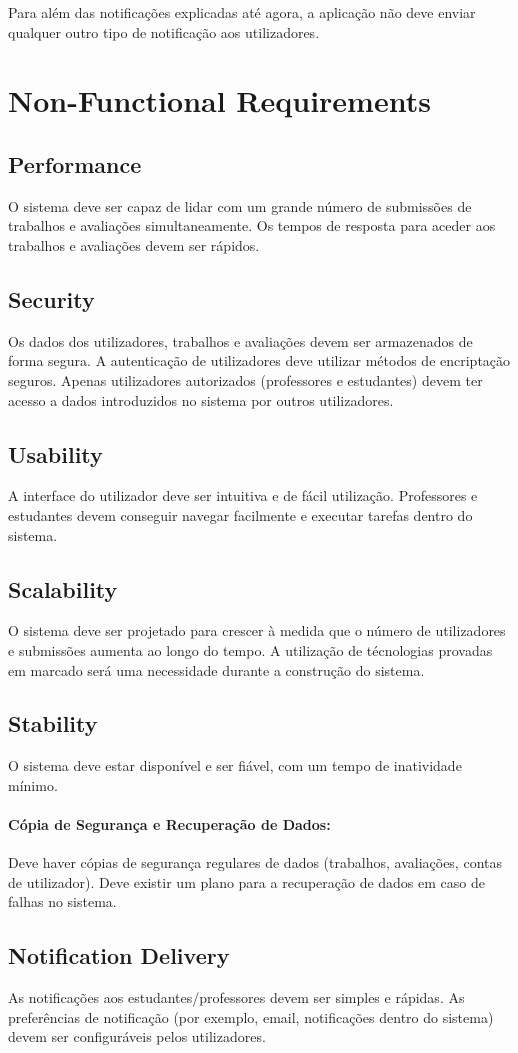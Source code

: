 \documentclass[10pt]{article}
\begin{document}
Para além das notificações explicadas até agora, a aplicação não deve enviar qualquer outro tipo de notificação
aos utilizadores.

\newpage

\section{Non-Functional Requirements}

\subsection{Performance}
O sistema deve ser capaz de lidar com um grande número de submissões de trabalhos e avaliações simultaneamente. 
Os tempos de resposta para aceder aos trabalhos e avaliações devem ser rápidos.

\subsection{Security}
Os dados dos utilizadores, trabalhos e avaliações devem ser armazenados de forma segura. 
A autenticação de utilizadores deve utilizar métodos de encriptação seguros. 
Apenas utilizadores autorizados (professores e estudantes) devem ter acesso a dados introduzidos no sistema por outros 
utilizadores.

\subsection{Usability}
A interface do utilizador deve ser intuitiva e de fácil utilização.
Professores e estudantes devem conseguir navegar facilmente e executar tarefas dentro do sistema.

\subsection{Scalability}
O sistema deve ser projetado para crescer à medida que o número de utilizadores e submissões aumenta ao longo do tempo.
A utilização de técnologias provadas em marcado será uma necessidade durante a construção do sistema.

\subsection{Stability}
O sistema deve estar disponível e ser fiável, com um tempo de inatividade mínimo.

\paragraph{Cópia de Segurança e Recuperação de Dados:}
Deve haver cópias de segurança regulares de dados (trabalhos, avaliações, contas de utilizador).
Deve existir um plano para a recuperação de dados em caso de falhas no sistema.

\subsection{Notification Delivery}
As notificações aos estudantes/professores devem ser simples e rápidas. 
As preferências de notificação (por exemplo, email, notificações dentro do sistema) devem ser configuráveis pelos utilizadores.
\end{document}
